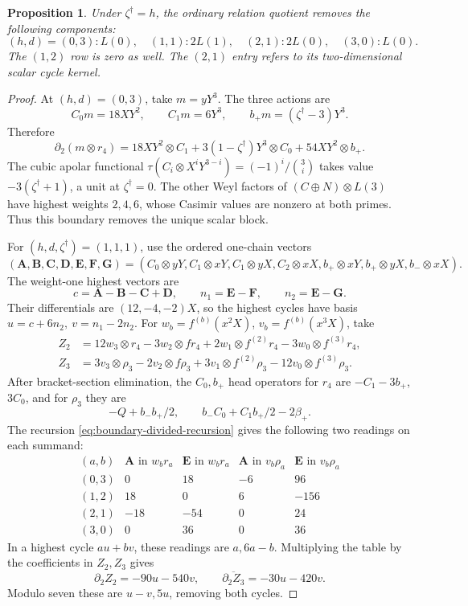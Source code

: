 \documentclass[11pt]{article}
\theoremstyle{plain}
\newtheorem{proposition}[proposition]{Proposition}
\theoremstyle{definition}
\theoremstyle{remark}
\numberwithin{equation}{section}
\begin{document}
\begin{proposition}\label{prop:low-horizontal}
Under \(\zeta^\dagger=h\), the ordinary relation quotient removes the
following components:
\[
 (h,d)=(0,3):L(0),\quad (1,1):2L(1),\quad
 (2,1):2L(0),\quad (3,0):L(0).
\]
The \((1,2)\) row is zero as well.
The \((2,1)\) entry refers to its two-dimensional scalar cycle kernel.
\end{proposition}
\begin{proof}
At \((h,d)=(0,3)\), take \(m=yY^3\).
The three actions are
\[
 C_0m=18XY^2,\qquad C_1m=6Y^3,\qquad
 b_+m=(\zeta^\dagger-3)Y^3 .
\]
Therefore
\[
 \partial_2(m\otimes r_4)=18XY^2\otimes C_1+
       3(1-\zeta^\dagger)Y^3\otimes C_0+54XY^2\otimes b_+ .
\]
The cubic apolar functional
\(\tau(C_i\otimes X^iY^{3-i})=(-1)^i/\binom3i\)
takes value \(-3(\zeta^\dagger+1)\), a unit at \(\zeta^\dagger=0\).
The other Weyl factors of \((C\oplus N)\otimes L(3)\) have highest
weights \(2,4,6\), whose Casimir values are nonzero at both primes.
Thus this boundary removes the unique scalar block.

For \((h,d,\zeta^\dagger)=(1,1,1)\), use the ordered one-chain vectors
\[
 (\mathbf A,\mathbf B,\mathbf C,\mathbf D,\mathbf E,\mathbf F,\mathbf G)
 =(C_0\otimes yY,C_1\otimes xY,C_1\otimes yX,C_2\otimes xX,
   b_+\otimes xY,b_+\otimes yX,b_-\otimes xX).
\]
The weight-one highest vectors are
\[
 c=\mathbf A-\mathbf B-\mathbf C+\mathbf D,\qquad
 n_1=\mathbf E-\mathbf F,\qquad n_2=\mathbf E-\mathbf G.
\]
Their differentials are \((12,-4,-2)X\), so the highest cycles have basis
\(u=c+6n_2,\ v=n_1-2n_2\).
For \(w_b=f^{(b)}(x^2X)\), \(v_b=f^{(b)}(x^3X)\), take
\begin{align*}
 Z_2&=12w_3\otimes r_4-3w_2\otimes fr_4
                 +2w_1\otimes f^{(2)}r_4-3w_0\otimes f^{(3)}r_4,\\
 Z_3&=3v_3\otimes\rho_3-2v_2\otimes f\rho_3
                 +3v_1\otimes f^{(2)}\rho_3-12v_0\otimes f^{(3)}\rho_3 .
\end{align*}
After bracket-section elimination, the \(C_0,b_+\) head operators for
\(r_4\) are \(-C_1-3b_+\), \(3C_0\), and for \(\rho_3\) they are
\[
 -Q+b_-b_+/2,\qquad b_-C_0+C_1b_+/2-2\beta_+.
\]
The recursion \eqref{eq:boundary-divided-recursion} gives the following
two readings on each summand:
\[
\begin{array}{c|rr|rr}
 (a,b)&\mathbf A\text{ in }w_b r_a&\mathbf E\text{ in }w_b r_a&
       \mathbf A\text{ in }v_b\rho_a&\mathbf E\text{ in }v_b\rho_a\\\hline
 (0,3)&0&18&-6&96\\
 (1,2)&18&0&6&-156\\
 (2,1)&-18&-54&0&24\\
 (3,0)&0&36&0&36
\end{array}
\]
In a highest cycle \(au+bv\), these readings are \(a,6a-b\).
Multiplying the table by the coefficients in \(Z_2,Z_3\) gives
\[
 \partial_2Z_2=-90u-540v,\qquad
 \overline{\partial_2Z_3}=-30u-420v .
\]
Modulo seven these are \(u-v,5u\), removing both cycles.


\end{proof}
\end{document}
